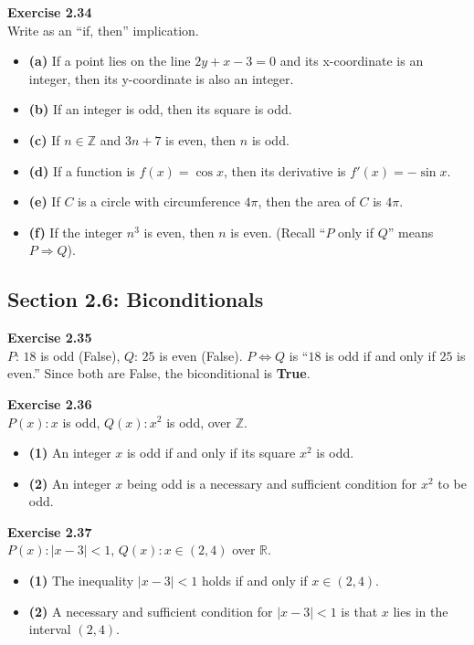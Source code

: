 \documentclass[11pt]{article}
\begin{document}
\vspace{10pt}
\textbf{Exercise 2.34} \\
Write as an ``if, then'' implication.
\begin{itemize}
    \item \textbf{(a)} If a point lies on the line $2y+x-3=0$ and its x-coordinate is an integer, then its y-coordinate is also an integer.
    \item \textbf{(b)} If an integer is odd, then its square is odd.
    \item \textbf{(c)} If $n \in \mathbb{Z}$ and $3n+7$ is even, then $n$ is odd.
    \item \textbf{(d)} If a function is $f(x) = \cos x$, then its derivative is $f'(x) = -\sin x$.
    \item \textbf{(e)} If $C$ is a circle with circumference $4\pi$, then the area of $C$ is $4\pi$.
    \item \textbf{(f)} If the integer $n^3$ is even, then $n$ is even. (Recall ``$P$ only if $Q$'' means $P \Rightarrow Q$).
\end{itemize}

\subsection{Section 2.6: Biconditionals}

\textbf{Exercise 2.35} \\
$P$: $18$ is odd (False), $Q$: $25$ is even (False). $P \Leftrightarrow Q$ is ``$18$ is odd if and only if $25$ is even.'' Since both are False, the biconditional is \textbf{True}.

\vspace{10pt}
\textbf{Exercise 2.36} \\
$P(x): x$ is odd, $Q(x): x^2$ is odd, over $\mathbb{Z}$.
\begin{itemize}
    \item \textbf{(1)} An integer $x$ is odd if and only if its square $x^2$ is odd.
    \item \textbf{(2)} An integer $x$ being odd is a necessary and sufficient condition for $x^2$ to be odd.
\end{itemize}

\vspace{10pt}
\textbf{Exercise 2.37} \\
$P(x): |x-3| < 1$, $Q(x): x \in (2,4)$ over $\mathbb{R}$.
\begin{itemize}
    \item \textbf{(1)} The inequality $|x-3| < 1$ holds if and only if $x \in (2, 4)$.
    \item \textbf{(2)} A necessary and sufficient condition for $|x-3| < 1$ is that $x$ lies in the interval $(2, 4)$.
\end{itemize}
\end{document}
